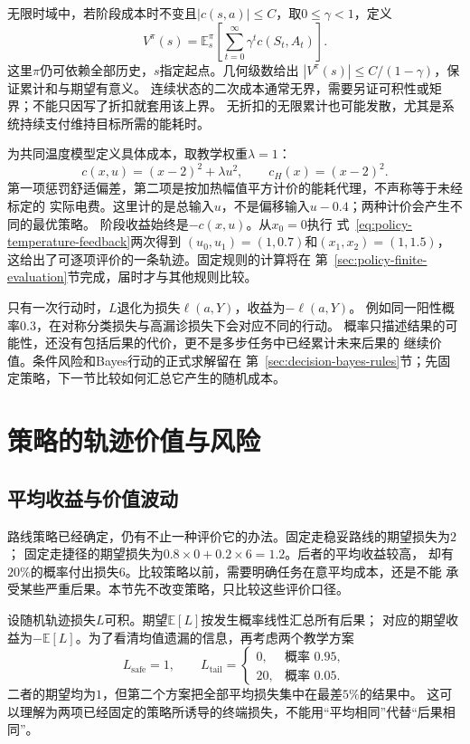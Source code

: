 无限时域中，若阶段成本时不变且$|c(s,a)|\leq C$，取$0\leq\gamma<1$，定义
\begin{equation}
  V^\pi(s)=
  \mathbb E_s^\pi\left[\sum_{t=0}^{\infty}\gamma^t c(S_t,A_t)\right].
  \label{eq:decision-discounted-value}
\end{equation}
这里$\pi$仍可依赖全部历史，$s$指定起点。几何级数给出
$|V^\pi(s)|\leq C/(1-\gamma)$，保证累计和与期望有意义。
连续状态的二次成本通常无界，需要另证可积性或矩界；不能只因写了折扣就套用该上界。
无折扣的无限累计也可能发散，尤其是系统持续支付维持目标所需的能耗时。

为共同温度模型定义具体成本，取教学权重$\lambda=1$：
\begin{equation}
  c(x,u)=(x-2)^2+\lambda u^2,\qquad c_H(x)=(x-2)^2.
  \label{eq:policy-temperature-cost}
\end{equation}
第一项惩罚舒适偏差，第二项是按加热幅值平方计价的能耗代理，不声称等于未经标定的
实际电费。这里计的是总输入$u$，不是偏移输入$u-0.4$；两种计价会产生不同的最优策略。
阶段收益始终是$-c(x,u)$。从$x_0=0$执行
式~\eqref{eq:policy-temperature-feedback}两次得到
$(u_0,u_1)=(1,0.7)$和$(x_1,x_2)=(1,1.5)$，
这给出了可逐项评价的一条轨迹。固定规则的计算将在
第~\ref{sec:policy-finite-evaluation}节完成，届时才与其他规则比较。

只有一次行动时，$L$退化为损失$\ell(a,Y)$，收益为$-\ell(a,Y)$。
例如同一阳性概率$0.3$，在对称分类损失与高漏诊损失下会对应不同的行动。
概率只描述结果的可能性，还没有包括后果的代价，更不是多步任务中已经累计未来后果的
继续价值。条件风险和Bayes行动的正式求解留在
第~\ref{sec:decision-bayes-rules}节；先固定策略，下一节比较如何汇总它产生的随机成本。

\section{策略的轨迹价值与风险}
\label{sec:decision-risk-criteria-robustness}

\subsection{平均收益与价值波动}

路线策略已经确定，仍有不止一种评价它的办法。固定走稳妥路线的期望损失为$2$；
固定走捷径的期望损失为$0.8\times0+0.2\times6=1.2$。后者的平均收益较高，
却有$20\%$的概率付出损失$6$。比较策略以前，需要明确任务在意平均成本，还是不能
承受某些严重后果。本节先不改变策略，只比较这些评价口径。

设随机轨迹损失$L$可积。期望$\mathbb E[L]$按发生概率线性汇总所有后果；
对应的期望收益为$-\mathbb E[L]$。为了看清均值遗漏的信息，再考虑两个教学方案
\[
  L_{\mathrm{safe}}=1,\qquad
  L_{\mathrm{tail}}=
  \begin{cases}
    0,&\text{概率 }0.95,\\
    20,&\text{概率 }0.05.
  \end{cases}
\]
二者的期望均为$1$，但第二个方案把全部平均损失集中在最差$5\%$的结果中。
这可以理解为两项已经固定的策略所诱导的终端损失，不能用“平均相同”代替“后果相同”。

